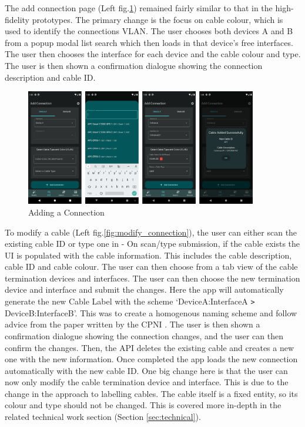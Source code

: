 \documentclass [11pt,a4paper]{article}
\begin{document}
The add connection page (Left fig.\ref{fig:add_connection}) remained fairly similar to that in the high-fidelity prototypes. The primary change is the focus on cable colour, which is used to identify the connections VLAN. The user chooses both devices A and B from a popup modal list search which then loads in that device's free interfaces. The user then chooses the interface for each device and the cable colour and type. The user is then shown a confirmation dialogue showing the connection description and cable ID.  

\begin{figure}[H]
    \centering
    \includegraphics[width=0.9\textwidth]{images/final_add.png}
    \caption{Adding a Connection}
    \label{fig:add_connection}
\end{figure}

 
To modify a cable (Left fig.\ref{fig:modify_connection}), the user can either scan the existing cable ID or type one in - On scan/type submission, if the cable exists the UI is populated with the cable information. This includes the cable description, cable ID and cable colour. The user can then choose from a tab view of the cable termination devices and interfaces. The user can then choose the new termination device and interface and submit the changes. Here the app will automatically generate the new Cable Label with the scheme `DeviceA:InterfaceA \verb|>| DeviceB:InterfaceB'. This was to create a homogenous naming scheme and follow advice from the paper written by the CPNI \cite{cpni}. The user is then shown a confirmation dialogue showing the connection changes, and the user can then confirm the changes. Then, the API deletes the existing cable and creates a new one with the new information. Once completed the app loads the new connection automatically with the new cable ID. One big change here is that the user can now only modify the cable termination device and interface. This is due to the change in the approach to labelling cables. The cable itself is a fixed entity, so its colour and type should not be changed. This is covered more in-depth in the related technical work section (Section \ref{sec:technical}).
\end{document}
